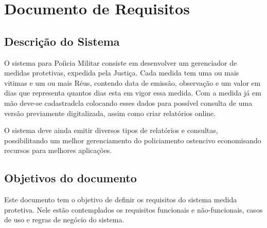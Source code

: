 \documentclass[
	12pt,				%
    oneside,			%
	a4paper,			%
	english,			%
	french,				%
	spanish,			%
	brazil,				%
	]{abntex2}
\begin{document}
\frenchspacing 


\imprimircapa

\imprimirfolhaderosto*

\tableofcontents


\textual




\chapter{Documento de Requisitos} %
	\section{Descrição do Sistema}
		O sistema para Poíicia Militar consiste em desenvolver um gerenciador de medidas protetivas, expedida pela Justiça. Cada medida tem uma ou mais vitimas e um ou mais Réus, contendo data de emissão, observação e um valor em dias que representa quantos dias esta em vigor essa medida. Com a medida já em mão deve-se cadastradcla colocando esses dados para possível consulta de uma versão previamente digitalizada, assim como criar relatórios online.
	
		O sistema deve ainda emitir diversos tipos de relatórios e consultas, possibilitando um melhor gerenciamento do policiamento ostencivo economisando recursos para melhores aplicações.
		
	\section{Objetivos do documento}
	
		Este documento tem o objetivo de definir os requisitos do sistema medida protetiva. Nele estão contemplados os requisitos funcionais e não-funcionais, casos de uso e regras de negócio do sistema.
	
\end{document}
